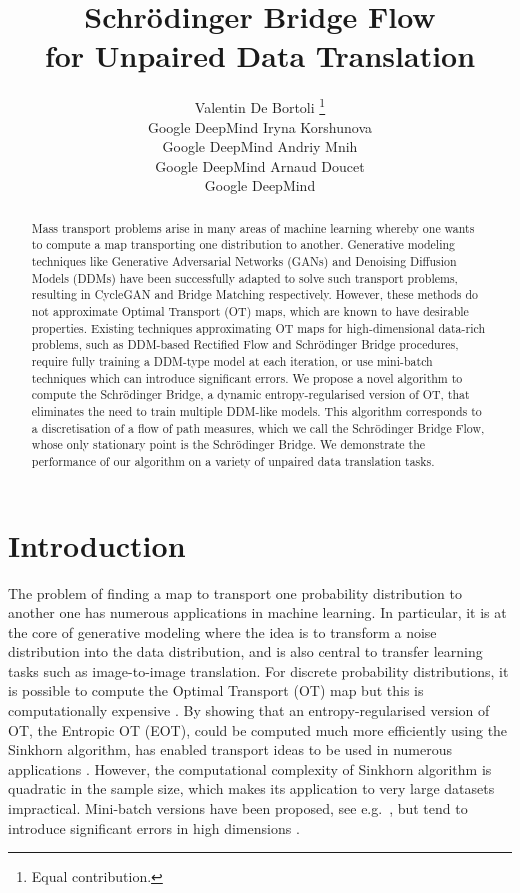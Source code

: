 \documentclass{article}
\title{Schr\"odinger Bridge Flow \\ for Unpaired Data Translation}
\author{%
    Valentin De Bortoli \thanks{Equal contribution.} \\
    Google DeepMind
\And
    Iryna Korshunova \footnotemark[1] \\
    Google DeepMind
\And
    Andriy Mnih
 \\
    Google DeepMind
\And
    Arnaud Doucet \\
    Google DeepMind
}
\begin{document}
\maketitle

\begin{abstract}
Mass transport problems arise in many areas of machine learning whereby one wants to compute a map transporting one distribution to another. Generative modeling techniques like Generative Adversarial Networks (GANs) and Denoising Diffusion Models (DDMs) have been successfully adapted to solve such transport problems, resulting in CycleGAN and Bridge Matching respectively. However, these methods do not approximate Optimal Transport (OT) maps, which are known to have desirable properties. Existing techniques approximating OT maps for high-dimensional data-rich problems, such as DDM-based Rectified Flow and Schr\"odinger Bridge procedures, require fully training a DDM-type model at each iteration, or use mini-batch techniques which can introduce significant errors. We propose a novel algorithm to compute the Schr\"odinger Bridge, a dynamic entropy-regularised version of OT, that eliminates the need to train multiple DDM-like models. This algorithm corresponds to a discretisation of a flow of path measures, which we call the Schr\"odinger Bridge Flow, whose only stationary point is the Schr\"odinger Bridge. We demonstrate the performance of our algorithm on a variety of unpaired data translation tasks.
\end{abstract}

\section{Introduction}
The problem of finding a map to transport one probability distribution to another one has numerous applications in machine learning. In particular, it is at the core of generative modeling where the idea is to transform a noise distribution into the data distribution, and is also central to transfer learning tasks such as image-to-image translation. For discrete probability distributions, it is possible to compute the Optimal Transport (OT) map but this is computationally expensive \citep{peyre2019computational}. By showing that an entropy-regularised version of OT, the Entropic OT (EOT), could be computed much more efficiently using the Sinkhorn algorithm, \cite{cuturi2013sinkhorn} has enabled transport ideas to be used in numerous applications \citep{ge2021ota,zhou2022rethinking}. %
However, the computational complexity of Sinkhorn algorithm is quadratic in the sample size, which makes its application to very large datasets impractical. Mini-batch versions have been proposed, see e.g.~\citep{genevay18a}, but tend to introduce significant errors in high dimensions \citep{sommerfeld2019optimal}.
\end{document}
